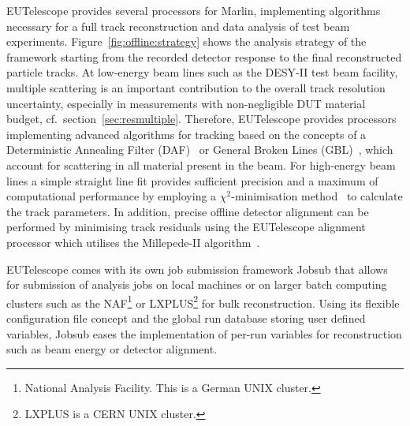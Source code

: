 EUTelescope provides several processors for Marlin, implementing algorithms necessary for a full track reconstruction and data analysis of test beam experiments. 
Figure~\ref{fig:offline:strategy} shows the analysis strategy of the framework starting from the recorded detector response to the final reconstructed particle tracks. 
At low-energy beam lines such as the DESY-II test beam facility, multiple scattering is an important contribution to the overall track resolution uncertainty,
 especially in measurements with non-negligible DUT material budget, cf.\ section~\ref{sec:resmultiple}.
Therefore, EUTelescope provides processors implementing advanced algorithms for tracking based on the concepts of a Deterministic Annealing Filter (DAF)~\cite{ref:daffitter}
 or General Broken Lines (GBL)~\cite{Blobel20111760,Kleinwort-2012}, which account for scattering in all material present in the beam. 
For high-energy beam lines a simple straight line fit provides sufficient precision and a maximum of computational performance by employing a $\chi^{2}$-minimisation method~\cite{ref:eudetmemo_2007_01,ref:lutzpaper} to calculate the track parameters.
In addition, precise offline detector alignment can be performed by minimising track residuals using the EUTelescope alignment processor which utilises the Millepede-II algorithm~\cite{Blobel-2006}.

EUTelescope comes with its own job submission framework Jobsub that allows for submission of analysis jobs on local machines or on larger batch computing clusters such as the NAF\footnote{National Analysis Facility. This is a German UNIX cluster.}
 or LXPLUS\footnote{LXPLUS is a CERN UNIX cluster.} for bulk reconstruction.
Using its flexible configuration file concept and the global run database storing user defined variables,
 Jobsub eases the implementation of per-run variables for reconstruction such as beam energy or detector alignment.

